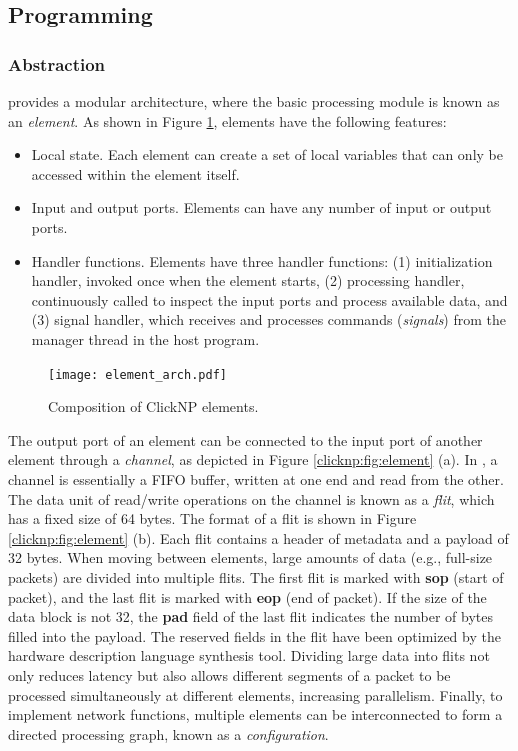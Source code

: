 \subsection{\name Programming}

\subsubsection{Abstraction}

\name provides a modular architecture, where the basic processing module is known as an \textit{element}. As shown in Figure \ref{clicknp:fig:element_arch}, \name elements have the following features:
\begin{itemize}
\item Local state. Each element can create a set of local variables that can only be accessed within the element itself.
\item Input and output ports. Elements can have any number of input or output ports.
\item Handler functions. Elements have three handler functions: (1) initialization handler, invoked once when the element starts, (2) processing handler, continuously called to inspect the input ports and process available data, and (3) signal handler, which receives and processes commands (\textit {signals}) from the manager thread in the host program.
\end{itemize}

\begin{figure}[htbp]
\centering
\texttt{[image: element\_arch.pdf]}
\caption{Composition of ClickNP elements.}
\label{clicknp:fig:element_arch}
\end{figure}

The output port of an element can be connected to the input port of another element through a \textit {channel}, as depicted in Figure \ref {clicknp:fig:element} (a). In \name, a channel is essentially a FIFO buffer, written at one end and read from the other. The data unit of read/write operations on the channel is known as a \textit {flit}, which has a fixed size of 64 bytes. The format of a flit is shown in Figure \ref {clicknp:fig:element} (b). Each flit contains a header of metadata and a payload of 32 bytes. When moving between \name elements, large amounts of data (e.g., full-size packets) are divided into multiple flits. The first flit is marked with \textbf {sop} (start of packet), and the last flit is marked with \textbf {eop} (end of packet). If the size of the data block is not 32, the \textbf {pad} field of the last flit indicates the number of bytes filled into the payload. The reserved fields in the flit have been optimized by the hardware description language synthesis tool. Dividing large data into flits not only reduces latency but also allows different segments of a packet to be processed simultaneously at different elements, increasing parallelism. Finally, to implement network functions, multiple \name elements can be interconnected to form a directed processing graph, known as a \name \textit {configuration}.

